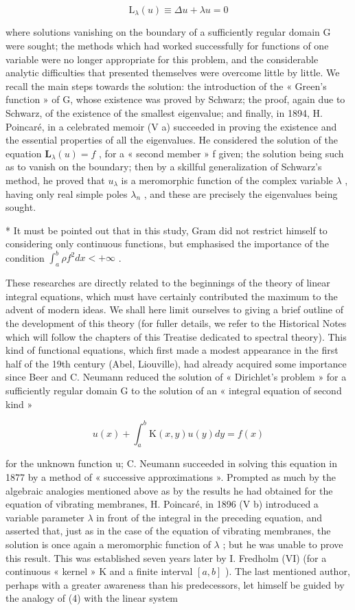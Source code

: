 \[
\mathrm{L} _ {\lambda} (u) \equiv \Delta u + \lambda u = 0\tag{3}
\]

where solutions vanishing on the boundary of a sufficiently regular domain G were sought; the methods which had worked successfully for functions of one variable were no longer appropriate for this problem, and the considerable analytic difficulties that presented themselves were overcome little by little. We recall the main steps towards the solution: the introduction of the « Green's function » of G, whose existence was proved by Schwarz; the proof, again due to Schwarz, of the existence of the smallest eigenvalue; and finally, in 1894, H. Poincaré, in a celebrated memoir (V a) succeeded in proving the existence and the essential properties of all the eigenvalues. He considered the solution of the equation \(\mathbf{L}_{\lambda}(u) = f\) , for a « second member » f given; the solution being such as to vanish on the boundary; then by a skillful generalization of Schwarz's method, he proved that \(u_{\lambda}\) is a meromorphic function of the complex variable \(\lambda\) , having only real simple poles \(\lambda_{n}\) , and these are precisely the eigenvalues being sought.

* It must be pointed out that in this study, Gram did not restrict himself to considering only continuous functions, but emphasised the importance of the condition \(\int_{a}^{b} \rho f^2 dx < +\infty\) .

These researches are directly related to the beginnings of the theory of linear integral equations, which must have certainly contributed the maximum to the advent of modern ideas. We shall here limit ourselves to giving a brief outline of the development of this theory (for fuller details, we refer to the Historical Notes which will follow the chapters of this Treatise dedicated to spectral theory). This kind of functional equations, which first made a modest appearance in the first half of the 19th century (Abel, Liouville), had already acquired some importance since Beer and C. Neumann reduced the solution of « Dirichlet's problem » for a sufficiently regular domain G to the solution of an « integral equation of second kind »

\[
u (x) + \int_ {a} ^ {b} \mathrm{K} (x, y) u (y) d y = f (x)\tag{4}
\]

for the unknown function u; C. Neumann succeeded in solving this equation in 1877 by a method of « successive approximations ». Prompted as much by the algebraic analogies mentioned above as by the results he had obtained for the equation of vibrating membranes, H. Poincaré, in 1896 (V b) introduced a variable parameter \(\lambda\) in front of the integral in the preceding equation, and asserted that, just as in the case of the equation of vibrating membranes, the solution is once again a meromorphic function of \(\lambda\) ; but he was unable to prove this result. This was established seven years later by I. Fredholm (VI) (for a continuous « kernel » K and a finite interval \([a, b]\) ). The last mentioned author, perhaps with a greater awareness than his predecessors, let himself be guided by the analogy of (4) with the linear system

